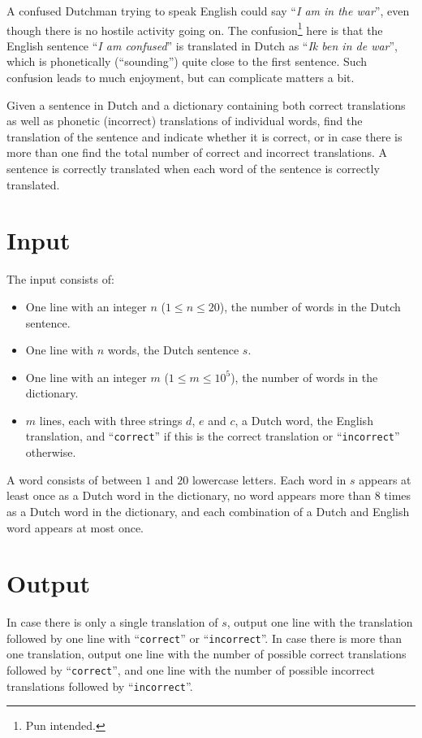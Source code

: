 
%
%
A confused Dutchman trying to speak English could say ``\emph{I am in the war}'', even though there is no hostile activity going on. The confusion\footnote{Pun intended.} here is that the English sentence ``\emph{I am confused}'' is translated in Dutch as ``\emph{Ik ben in de war}'', which is phonetically (``sounding'') quite close to the first sentence. Such confusion leads to much enjoyment, but can complicate matters a bit.

Given a sentence in Dutch and a dictionary containing both correct translations as well as phonetic (incorrect) translations of individual words, find the translation of the sentence and indicate whether it is correct, or in case there is more than one find the total number of correct and incorrect translations. A sentence is correctly translated when each word of the sentence is correctly translated.

\section*{Input}

The input consists of:
\begin{itemize}
\item One line with an integer $n$ ($1 \leq n \leq 20$), the number of words in the Dutch sentence.
\item One line with $n$ words, the Dutch sentence $s$.
\item One line with an integer $m$ ($1 \leq m \leq 10^5$), the number of words in the dictionary.
\item $m$ lines, each with three strings $d$, $e$ and $c$, a Dutch word, the English translation, and ``\texttt{correct}'' if this is the correct translation or ``\texttt{incorrect}'' otherwise.
\end{itemize}

A word consists of between $1$ and $20$ lowercase letters. Each word in $s$ appears at least once as a Dutch word in the dictionary, no word appears more than $8$ times as a Dutch word in the dictionary, and each combination of a Dutch and English word appears at most once.

\section*{Output}

In case there is only a single translation of $s$, output one line with the translation followed by one line with ``\texttt{correct}'' or ``\texttt{incorrect}''. In case there is more than one translation, output one line with the number of possible correct translations followed by ``\texttt{correct}'', and one line with the number of possible incorrect translations followed by ``\texttt{incorrect}''.
